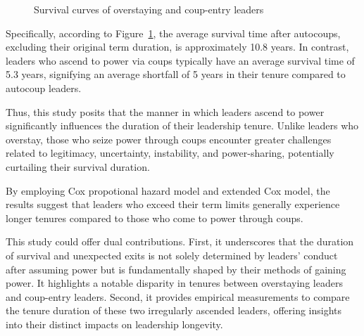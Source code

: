 \documentclass[
  12pt,
  a4paper,
  12pt]{article}
\begin{document}
\begin{figure}


\caption{\label{fig-logrank}Survival curves of overstaying and
coup-entry leaders}

\end{figure}%

Specifically, according to Figure~\ref{fig-logrank}, the average
survival time after autocoups, excluding their original term duration,
is approximately 10.8 years. In contrast, leaders who ascend to power
via coups typically have an average survival time of 5.3 years,
signifying an average shortfall of 5 years in their tenure compared to
autocoup leaders.

Thus, this study posits that the manner in which leaders ascend to power
significantly influences the duration of their leadership tenure. Unlike
leaders who overstay, those who seize power through coups encounter
greater challenges related to legitimacy, uncertainty, instability, and
power-sharing, potentially curtailing their survival duration.

By employing Cox propotional hazard model and extended Cox model, the
results suggest that leaders who exceed their term limits generally
experience longer tenures compared to those who come to power through
coups.

This study could offer dual contributions. First, it underscores that
the duration of survival and unexpected exits is not solely determined
by leaders' conduct after assuming power but is fundamentally shaped by
their methods of gaining power. It highlights a notable disparity in
tenures between overstaying leaders and coup-entry leaders. Second, it
provides empirical measurements to compare the tenure duration of these
two irregularly ascended leaders, offering insights into their distinct
impacts on leadership longevity.
\end{document}
